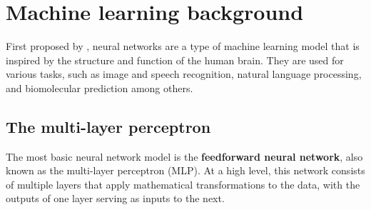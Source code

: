 
\FloatBarrier
\section{Machine learning background}
\label{sec:machine-learning}
First proposed by \citet{rosenblatt1958}, neural networks are a type of machine learning model that is inspired by the structure and function of the human brain. 
They are used for various tasks, such as image and speech recognition, natural language processing, and biomolecular prediction among others.

\subsection{The multi-layer perceptron}
The most basic neural network model is the \textbf{feedforward neural network}, also known as the multi-layer perceptron (MLP). At a high level, this network consists of multiple layers that apply mathematical transformations to the data, with the outputs of one layer serving as inputs to the next. 

